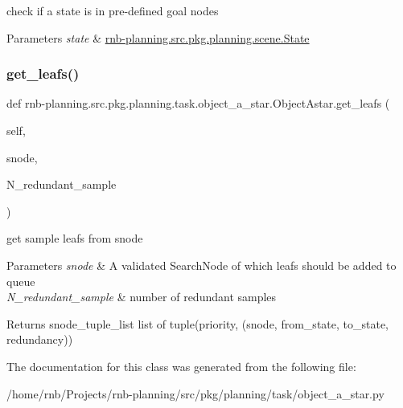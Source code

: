 check if a state is in pre-\/defined goal nodes 


\begin{DoxyParams}{Parameters}
{\em state} & \hyperlink{classrnb-planning_1_1src_1_1pkg_1_1planning_1_1scene_1_1_state}{rnb-\/planning.\+src.\+pkg.\+planning.\+scene.\+State} \\
\hline
\end{DoxyParams}
\mbox{\label{classrnb-planning_1_1src_1_1pkg_1_1planning_1_1task_1_1object__a__star_1_1_object_astar_a2cfff333be0d1e6f77f2474d65a80e21}} 
\subsubsection{\texorpdfstring{get\+\_\+leafs()}{get\_leafs()}}
{\footnotesize\ttfamily def rnb-\/planning.\+src.\+pkg.\+planning.\+task.\+object\+\_\+a\+\_\+star.\+Object\+Astar.\+get\+\_\+leafs (\begin{DoxyParamCaption}\item[{}]{self,  }\item[{}]{snode,  }\item[{}]{N\+\_\+redundant\+\_\+sample }\end{DoxyParamCaption})}



get sample leafs from snode 


\begin{DoxyParams}{Parameters}
{\em snode} & A validated Search\+Node of which leafs should be added to queue \\
\hline
{\em N\+\_\+redundant\+\_\+sample} & number of redundant samples \\
\hline
\end{DoxyParams}
\begin{DoxyReturn}{Returns}
snode\+\_\+tuple\+\_\+list list of tuple(priority, (snode, from\+\_\+state, to\+\_\+state, redundancy)) 
\end{DoxyReturn}


The documentation for this class was generated from the following file\+:\begin{DoxyCompactItemize}
\item 
/home/rnb/\+Projects/rnb-\/planning/src/pkg/planning/task/object\+\_\+a\+\_\+star.\+py\end{DoxyCompactItemize}
